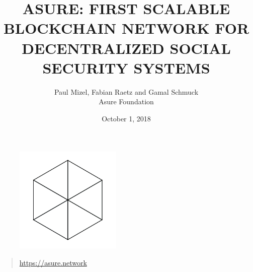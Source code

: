 \begin{figure}
    \centering
    \includegraphics[width=2.0in]{img/logo.png}
\end{figure}

\title{ASURE: FIRST SCALABLE BLOCKCHAIN NETWORK FOR DECENTRALIZED SOCIAL SECURITY SYSTEMS}
\author{Paul Mizel, Fabian Raetz and Gamal Schmuck \\Asure Foundation}
\date{October 1, 2018}
\maketitle

\vskip 2.5in

\begin{quote}
	\centering
	\url{https://asure.network}
\end{quote}

\newpage 
